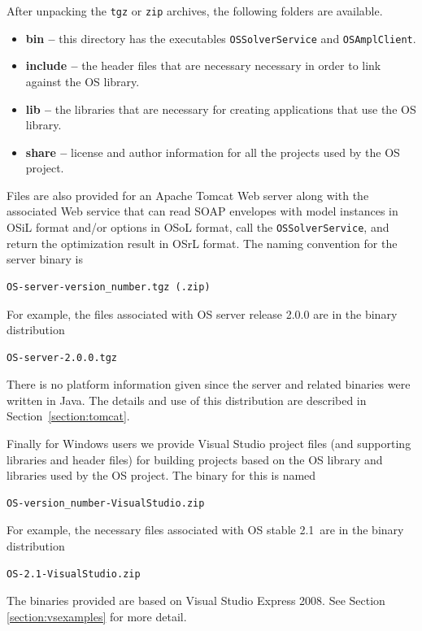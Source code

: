 \documentclass[11pt]{article}
\renewcommand{\_}{{\char"5F}}
\renewcommand{\{}{{\char"7B}}
\renewcommand{\}}{{\char"7D}}
\renewcommand{\^}{{\char"0D}}
\renewcommand{\'}{{\char"0D}}
\newcommand{\OSstable}{2.1}
\begin{document}
After unpacking the {\tt tgz} or {\tt zip} archives, the following folders are available.
\begin{itemize}

\item[] {\bf bin --} this directory has the executables {\tt OSSolverService} 
and {\tt OSAmplClient}.

\item[]  {\bf include --} the header files that are necessary necessary  in order to link against the OS library.

\item[] {\bf lib --} the libraries that are necessary for creating applications that use the OS library.

\item[] {\bf  share --} license and author information for all the projects used by the OS project.
\end{itemize}



Files are also provided for an Apache Tomcat Web server along with the associated Web service
that can
read SOAP  envelopes with model instances in OSiL format and/or options in 
OSoL format, call the {\tt OSSolverService},
and return the optimization result in OSrL format.
The naming convention for the server binary is
\begin{verbatim}
OS-server-version_number.tgz (.zip)
\end{verbatim}
For example, the files associated with  OS server release 2.0.0 are in the binary distribution
\begin{verbatim}
OS-server-2.0.0.tgz
\end{verbatim}
There is no platform information given since the server and related binaries were written in Java.
The details and use of this distribution are described in Section~\ref{section:tomcat}.

Finally for Windows users we provide Visual Studio  project files (and supporting
libraries and header files) for building projects based on the OS library and libraries used by the OS project.
The binary for this is named
\begin{verbatim}
OS-version_number-VisualStudio.zip
\end{verbatim}
For example, the necessary files associated with  OS  stable \OSstable\ are in the binary 
distribution
\begin{verbatim}
OS-2.1-VisualStudio.zip
\end{verbatim}
The binaries provided are based on Visual Studio Express 2008.  See Section \ref{section:vsexamples} for more detail.
\end{document}
